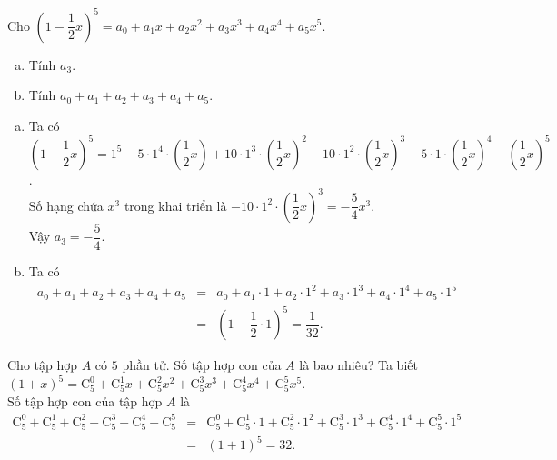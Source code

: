\begin{bt}%
	Cho $\left(1-\dfrac{1}{2}x\right)^5=a_0+a_1x+a_2x^2+a_3x^3+a_4x^4+a_5x^5$.
	\begin{enumerate}[a)]
		\item Tính $a_3$.
		\item Tính $a_0+a_1+a_2+a_3+a_4+a_5$.
	\end{enumerate}
	\loigiai
	{\begin{enumerate}[a)]
			\item Ta có $\left(1-\dfrac{1}{2}x\right)^5=1^5-5\cdot 1^4\cdot \left(\dfrac{1}{2}x\right)+ 10\cdot 1^3\cdot \left(\dfrac{1}{2}x\right)^2-10\cdot 1^2\cdot \left(\dfrac{1}{2}x\right)^3+5\cdot 1\cdot \left(\dfrac{1}{2}x\right)^4-\left(\dfrac{1}{2}x\right)^5$.\\
			Số hạng chứa $x^3$ trong khai triển là $-10\cdot 1^2\cdot \left(\dfrac{1}{2}x\right)^3=-\dfrac{5}{4}x^3$.\\
			Vậy $a_3=-\dfrac{5}{4}$.
			\item Ta có
			\begin{eqnarray*}
				a_0+a_1+a_2+a_3+a_4+a_5&=& a_0+a_1\cdot 1+a_2\cdot 1^2+a_3\cdot 1^3+a_4\cdot 1^4+a_5\cdot 1^5\\
				&=&\left(1-\dfrac{1}{2}\cdot 1\right)^5=\dfrac{1}{32}.
			\end{eqnarray*}
		\end{enumerate}
	}
\end{bt}

\begin{bt}%
	Cho tập hợp $A$ có $5$ phần tử. Số tập hợp con của $A$ là bao nhiêu?
	\loigiai
	{Ta biết $(1+x)^5=\mathrm{C}_5^0+\mathrm{C}_5^1x+\mathrm{C}_5^2x^2+\mathrm{C}_5^3x^3+\mathrm{C}_5^4 x^4+\mathrm{C}_5^5x^5$.\\
		Số tập hợp con của tập hợp $A$ là
		\begin{eqnarray*}
			\mathrm{C}_5^0+\mathrm{C}_5^1+\mathrm{C}_5^2+\mathrm{C}_5^3+\mathrm{C}_5^4+\mathrm{C}_5^5&=& \mathrm{C}_5^0+\mathrm{C}_5^1\cdot 1+\mathrm{C}_5^2\cdot 1^2+\mathrm{C}_5^3\cdot 1^3+\mathrm{C}_5^4 \cdot 1^4+\mathrm{C}_5^5\cdot 1^5\\
			&=&(1+1)^5=32.
		\end{eqnarray*}
	}
\end{bt}

